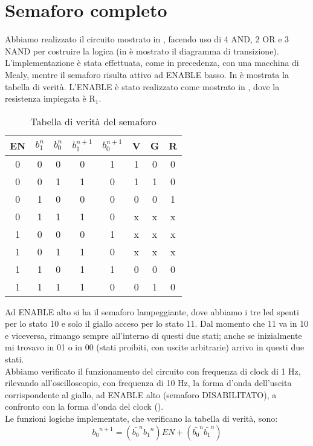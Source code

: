 \section{Semaforo completo}
Abbiamo realizzato il circuito mostrato in , facendo uso di 4 AND, 2 OR e 3 NAND per costruire la logica (in  è mostrato il diagramma di transizione). L'implementazione è stata effettuata, come in precedenza, con una macchina di Mealy, mentre il semaforo risulta attivo ad ENABLE basso. In  è mostrata la tabella di verità. L'ENABLE è stato realizzato come mostrato in , dove la resistenza impiegata è R$_1$.\\
\begin{table}[h]
	\centering
	\begin{tabular}{cccccccc}		
		 EN& $b_{1}^{n}$& $b_{0}^{n}$& $b_{1}^{n+1}$& $b_{0}^{n+1}$ &V & G& R\\
		 \midrule 
		  0 & 0 & 0 & 0 & 1 & 1 & 0 & 0 \\
		  0 & 0 & 1 & 1 & 0 & 1 & 1 & 0 \\
		  0 & 1 & 0 & 0 & 0 & 0 & 0 & 1 \\
          0 & 1 & 1 & 1 & 0 & x & x & x \\
		  1 & 0 & 0 & 0 & 1 & x & x & x \\
		  1 & 0 & 1 & 1 & 0 & x & x & x \\
		  1 & 1 & 0 & 1 & 1 & 0 & 0 & 0 \\
          1 & 1 & 1 & 1 & 0 & 0 & 1 & 0 \\          
 	\end{tabular}
	\caption{ Tabella di verità del semaforo }
	\label{t:tabella_verità}
\end{table}
Ad ENABLE alto si ha il semaforo lampeggiante, dove abbiamo i tre led spenti per lo stato 10 e solo il giallo acceso per lo stato 11. Dal momento che 11 va in 10 e viceversa, rimango sempre all'interno di questi due stati; anche se inizialmente mi trovavo in 01 o in 00 (stati proibiti, con uscite arbitrarie) arrivo in questi due stati.\\
Abbiamo verificato il funzionamento del circuito con frequenza di clock di 1 Hz, rilevando all'oscilloscopio, con frequenza di 10 Hz, la forma d'onda dell'uscita corrispondente al giallo, ad ENABLE alto (semaforo DISABILITATO), a confronto con la forma d'onda del clock ().\\
Le funzioni logiche implementate, che verificano la tabella di verità, sono:
\begin{equation}
{b_0}^{n+1} = ({\bar{b_0}}^{n} {b_1}^{n}) EN + ({\bar{b_0}}^{n} {\bar{b_1}}^{n})
\label{e:eq1}
\end{equation}
